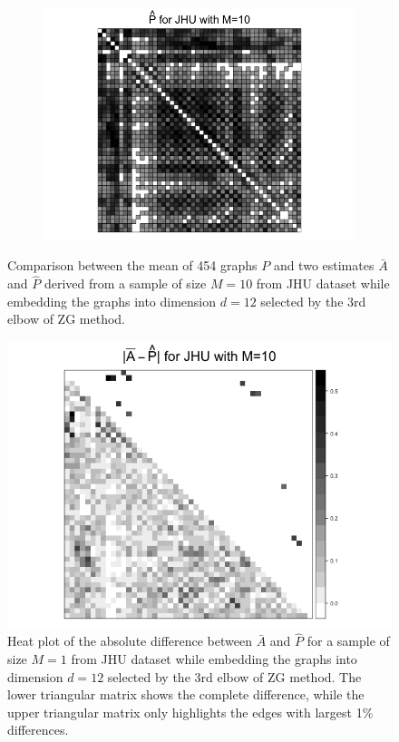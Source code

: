 \documentclass[a4paper]{article}
\begin{document}
\begin{figure}
\begin{subfigure}{.33\textwidth}
  \includegraphics[width=1.2\linewidth]{Phat_JHU_m10.png}
\end{subfigure}
\caption{Comparison between the mean of 454 graphs $P$ and two estimates $\bar{A}$ and $\hat{P}$ derived from a sample of size $M=10$ from JHU dataset while embedding the graphs into dimension $d=12$ selected by the 3rd elbow of ZG method.}
\label{fig:adj_JHU_m10}
\end{figure}

\begin{figure}[!htb]
\centering
\includegraphics[width=1\textwidth]{Diff_JHU_m10.png}
\caption{Heat plot of the absolute difference between $\bar{A}$ and $\hat{P}$ for a sample of size $M=1$ from JHU dataset while embedding the graphs into dimension $d=12$ selected by the 3rd elbow of ZG method. The lower triangular matrix shows the complete difference, while the upper triangular matrix only highlights the edges with largest 1\% differences.}
\label{fig:Diff_JHU_m10}
\end{figure}
\end{document}
